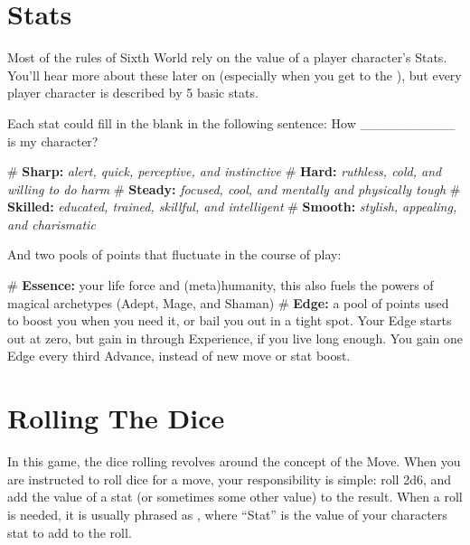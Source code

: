 \section{Stats}

Most of the rules of Sixth World rely on the value of a player character’s Stats. You’ll hear more about these later on (especially when you get to the ), but every player character is described by 5 basic stats.

Each stat could fill in the blank in the following sentence: How \_\_\_\_\_\_\_\_\_\_ is my character?

\begin{easylist}
# \textbf{Sharp:} \textit{alert, quick, perceptive, and instinctive}
# \textbf{Hard:} \textit{ruthless, cold, and willing to do harm}
# \textbf{Steady:} \textit{focused, cool, and mentally and physically tough}
# \textbf{Skilled:} \textit{educated, trained, skillful, and intelligent}
# \textbf{Smooth:} \textit{stylish, appealing, and charismatic}
\end{easylist}

And two pools of points that fluctuate in the course of play:

\begin{easylist}
# \textbf{Essence:} your life force and (meta)humanity, this also fuels the powers of magical archetypes (Adept, Mage, and Shaman)
# \textbf{Edge:} a pool of points used to boost you when you need it, or bail you out in a tight spot. Your Edge starts out at zero, but gain in through Experience, if you live long enough. You gain one Edge every third Advance, instead of new move or stat boost.
\end{easylist}




\section{Rolling The Dice}

In this game, the dice rolling revolves around the concept of the Move. When you are instructed to roll dice for a move, your responsibility is simple: roll 2d6, and add the value of a stat (or sometimes some other value) to the result. When a roll is needed, it is usually phrased as , where ``Stat'' is the value of your characters stat to add to the roll.

